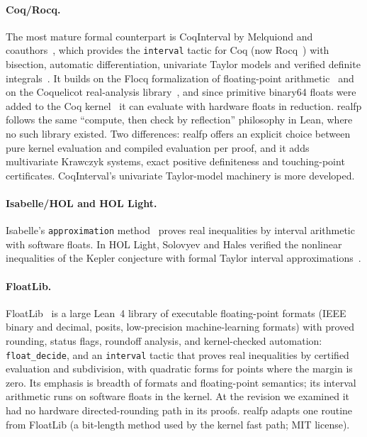 \documentclass[11pt]{article}
\theoremstyle{definition}
\theoremstyle{remark}
\newcommand{\lean}[1]{\texttt{#1}}
\newcommand{\realfp}{\textsf{realfp}}
\begin{document}
\paragraph{Coq/Rocq.} The most mature formal counterpart is CoqInterval by
Melquiond and coauthors~\cite{melquiond2008,martindorelmelquiond2016},
which provides the \lean{interval} tactic for Coq (now Rocq~\cite{rocq})
with bisection, automatic differentiation, univariate Taylor models and
verified definite integrals~\cite{mahboubi2016}. It builds on the Flocq
formalization of floating-point arithmetic~\cite{flocq} and on the
Coquelicot real-analysis library~\cite{coquelicot}, and since primitive
binary64 floats were added to the Coq kernel~\cite{primfloats} it can
evaluate with hardware floats in reduction. \realfp{} follows the same
``compute, then check by reflection'' philosophy in Lean, where no such
library existed. Two differences: \realfp{} offers an explicit choice
between pure kernel evaluation and compiled evaluation per proof, and it
adds multivariate Krawczyk systems, exact positive definiteness and
touching-point certificates. CoqInterval's univariate Taylor-model
machinery is more developed.

\paragraph{Isabelle/HOL and HOL Light.} Isabelle's \lean{approximation}
method~\cite{hoelzl2009} proves real inequalities by interval arithmetic
with software floats. In HOL Light, Solovyev and Hales verified the
nonlinear inequalities of the Kepler conjecture with formal Taylor interval
approximations~\cite{solovyevhales2013,flyspeck}.

\paragraph{FloatLib.} FloatLib~\cite{floatlib} is a large Lean~4 library of
executable floating-point formats (IEEE binary and decimal, posits,
low-precision machine-learning formats) with proved rounding, status flags,
roundoff analysis, and kernel-checked automation: \lean{float\_decide}, and
an \lean{interval} tactic that proves real inequalities by certified
evaluation and subdivision, with quadratic forms for points where the margin
is zero. Its emphasis is breadth of formats and floating-point semantics;
its interval arithmetic runs on software floats in the kernel. At the
revision we examined it had no hardware directed-rounding path in its
proofs. \realfp{} adapts one routine from FloatLib (a bit-length
method used by the kernel fast path; MIT license).
\end{document}
